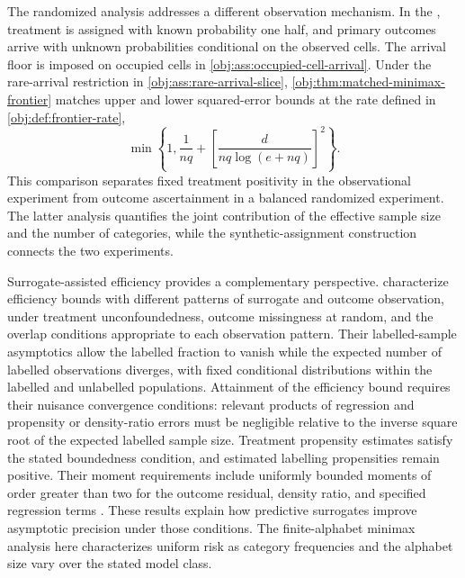 \documentclass[11pt]{article}
\begin{document}
The randomized analysis addresses a different observation mechanism. In the , treatment is assigned with known probability one half, and primary outcomes arrive with unknown probabilities conditional on the observed cells. The arrival floor  is imposed on occupied cells in \cref{obj:ass:occupied-cell-arrival}. Under the rare-arrival restriction in \cref{obj:ass:rare-arrival-slice}, \cref{obj:thm:matched-minimax-frontier} matches upper and lower squared-error bounds at the rate defined in \cref{obj:def:frontier-rate},
\[
\min\left\{1,\frac{1}{nq}
+\left[\frac{d}{nq\log(e+nq)}\right]^2\right\}.
\]
This comparison separates fixed treatment positivity in the observational experiment from outcome ascertainment in a balanced randomized experiment. The latter analysis quantifies the joint contribution of the effective sample size and the number of categories, while the synthetic-assignment construction connects the two experiments.

Surrogate-assisted efficiency provides a complementary perspective. \citet[Theorems 2.1--2.2 and 4.1--4.2]{KallusMao2025} characterize efficiency bounds with different patterns of surrogate and outcome observation, under treatment unconfoundedness, outcome missingness at random, and the overlap conditions appropriate to each observation pattern. Their labelled-sample asymptotics allow the labelled fraction to vanish while the expected number of labelled observations diverges, with fixed conditional distributions within the labelled and unlabelled populations. Attainment of the efficiency bound requires their nuisance convergence conditions: relevant products of regression and propensity or density-ratio errors must be negligible relative to the inverse square root of the expected labelled sample size. Treatment propensity estimates satisfy the stated boundedness condition, and estimated labelling propensities remain positive. Their moment requirements include uniformly bounded moments of order greater than two for the outcome residual, density ratio, and specified regression terms \citep[Assumption 7 and Appendix D.1, Assumption 9]{KallusMao2025}. These results explain how predictive surrogates improve asymptotic precision under those conditions. The finite-alphabet minimax analysis here characterizes uniform risk as category frequencies and the alphabet size vary over the stated model class.
\end{document}
